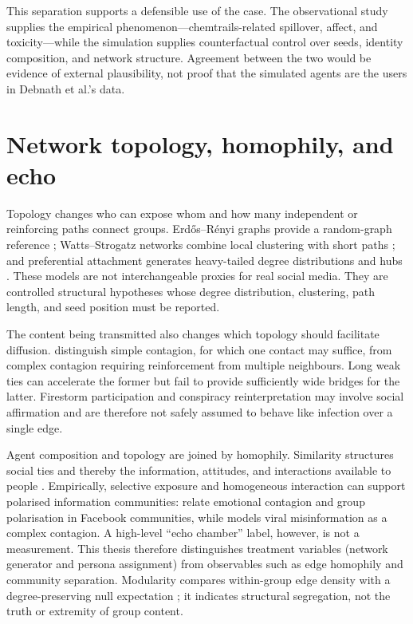 This separation supports a defensible use of the case.  The observational study
supplies the empirical phenomenon---chemtrails-related spillover, affect, and
toxicity---while the simulation supplies counterfactual control over seeds,
identity composition, and network structure.  Agreement between the two would
be evidence of external plausibility, not proof that the simulated agents are
the users in Debnath et al.'s data.

\section{Network topology, homophily, and echo}
\label{sec:lit-topology}

Topology changes who can expose whom and how many independent or reinforcing
paths connect groups.  Erd\H{o}s--R\'enyi graphs provide a random-graph reference
\parencite{erdos1960evolution}; Watts--Strogatz networks combine local clustering
with short paths \parencite{watts1998collective}; and preferential attachment
generates heavy-tailed degree distributions and hubs
\parencite{barabasi1999emergence}.  These models are not interchangeable proxies
for real social media.  They are controlled structural hypotheses whose degree
distribution, clustering, path length, and seed position must be reported.

The content being transmitted also changes which topology should facilitate
diffusion.  \textcite{centola2007complex} distinguish simple contagion, for which
one contact may suffice, from complex contagion requiring reinforcement from
multiple neighbours.  Long weak ties can accelerate the former but fail to
provide sufficiently wide bridges for the latter.  Firestorm participation and
conspiracy reinterpretation may involve social affirmation and are therefore
not safely assumed to behave like infection over a single edge.

Agent composition and topology are joined by homophily.  Similarity structures
social ties and thereby the information, attitudes, and interactions available
to people \parencite{mcpherson2001homophily}.  Empirically, selective exposure and
homogeneous interaction can support polarised information communities:
\textcite{delvicario2016echo} relate emotional contagion and group polarisation
in Facebook communities, while \textcite{tornberg2018echo} models viral
misinformation as a complex contagion.  A high-level ``echo chamber'' label,
however, is not a measurement.  This thesis therefore distinguishes treatment
variables (network generator and persona assignment) from observables such as
edge homophily and community separation.  Modularity compares within-group
edge density with a degree-preserving null expectation
\parencite{newman2006modularity}; it indicates structural segregation, not the
truth or extremity of group content.

